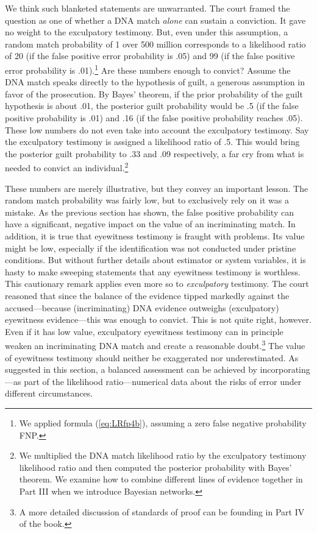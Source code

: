 \documentclass[
  10pt,
  dvipsnames,enabledeprecatedfontcommands]{scrartcl}
\newcommand{\raf}[1]{\todo[color=olive!40]{#1}}
\begin{document}
We think such blanketed statements are unwarranted. The court framed the
question as one of whether a DNA match \textit{alone} can sustain a
conviction. It gave no weight to the exculpatory testimony. But, even
under this assumption, a random match probability of 1 over 500 million
corresponds to a likelihood ratio of 20 (if the false positive error
probability is .05) and 99 (if the false positive error probability is
.01).\footnote{We applied formula (\ref{eq:LRfp4b}), assuming a zero
  false negative probability FNP.} Are these numbers enough to convict?
Assume the DNA match speaks directly to the hypothesis of guilt, a
generous assumption in favor of the prosecution. By Bayes' theorem, if
the prior probability of the guilt hypothesis is about .01, the
posterior guilt probability would be .5 (if the false positive
probability is .01) and .16 (if the false positive probability reaches
.05). These low numbers do not even take into account the exculpatory
testimony. Say the exculpatory testimony is assigned a likelihood ratio
of .5. This would bring the posterior guilt probability to .33 and .09
respectively, a far cry from what is needed to convict an
individual.\footnote{We multiplied the DNA match likelihood ratio by the
  exculpatory testimony likelihood ratio and then computed the posterior
  probability with Bayes' theorem. We examine how to combine different
  lines of evidence together in Part III when we introduce Bayesian
  networks.} \raf{M: Doublecheck calculations with R}

These numbers are merely illustrative, but they convey an important
lesson. The random match probability was fairly low, but to exclusively
rely on it was a mistake. As the previous section has shown, the false
positive probability can have a significant, negative impact on the
value of an incriminating match. In addition, it is true that eyewitness
testimony is fraught with problems. Its value might be low, especially
if the identification was not conducted under pristine conditions. But
without further details about estimator or system variables, it is hasty
to make sweeping statements that any eyewitness testimony is worthless.
This cautionary remark applies even more so to \textit{exculpatory}
testimony. The court reasoned that since the balance of the evidence
tipped markedly against the accused---because (incriminating) DNA
evidence outweighs (exculpatory) eyewitness evidence---this was enough
to convict. This is not quite right, however. Even if it has low value,
exculpatory eyewitness testimony can in principle weaken an
incriminating DNA match and create a reasonable doubt.\footnote{A more
  detailed discussion of standards of proof can be founding in Part IV
  of the book.} The value of eyewitness testimony should neither be
exaggerated nor underestimated. As suggested in this section, a balanced
assessment can be achieved by incorporating---as part of the likelihood
ratio---numerical data about the risks of error under different
circumstances.
\end{document}

